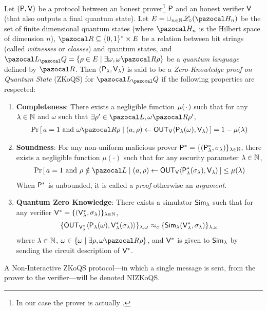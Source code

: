 \begin{definition}\label{def:NIZKoQS}
  Let $(\P,\V)$ be a protocol between an honest \QPT{} prover\footnote{In our case the prover is actually \PPT{}.} $\P{}$ and an honest \QPT{} verifier $\V{}$ (that also outputs a final quantum state). Let $E = \cup_{n \in \N} \linearOp_\circ(\cH_n)$ be the set of finite dimensional quantum states (where $\cH_n$ is the Hilbert space of dimension $n$), $\cR \subseteq \{0,1\}^* \times E $ be a relation between bit strings (called \emph{witnesses} or \emph{classes}) and quantum states, and $\lang_\cQ = \{\rho \in E \mid \exists \omega, \omega \cR \rho\}$ be a \emph{quantum language} defined by $\cR$. Then $(\P_\lambda{},\V_\lambda{})$ is said to be a \emph{Zero-Knowledge proof on Quantum State} (ZKoQS) for $\lang_\cQ$ if the following properties are respected:
  \begin{enumerate}
    \item \textbf{Completeness}: There exists a negligible function $\mu(\cdotwild)$ such that for any $\lambda \in \N$ and $\omega$ such that $\exists \rho' \in \lang, \omega \cR \rho'$,
          \begin{align}
            \pr{a = 1 \text{ and } \omega \cR \rho \mid (a,\rho) \leftarrow \OUT_\V{}\langle \P_\lambda(\omega), \V_\lambda\rangle} = 1-\mu(\lambda)
          \end{align}
    \item \textbf{Soundness}: For any non-uniform \QPT{} malicious prover $\P{}^* = \{(\P{}^*_\lambda, \sigma_\lambda)\}_{\lambda \in \N}$, there exists a negligible function $\mu(\cdot)$ such that for any security parameter $\lambda \in \N$,
          \begin{align}
            \pr{ a = 1 \text{ and } \rho \notin \lang \mid (a,\rho) \leftarrow \OUT_\V\langle \P{}^*_\lambda(\sigma_\lambda), \V_\lambda\rangle}\leq \mu(\lambda)
          \end{align}
          When $\P^*$ is unbounded, it is called a \emph{proof} otherwise an \emph{argument}.
    \item \textbf{Quantum Zero Knowledge}: There exists a \QPT{} simulator $\Sim_\lambda$ such that for any \QPT{} verifier $\V{}^* = \{(\V{}^*_\lambda,\sigma_\lambda)\}_{\lambda \in \N}$,
          \begin{align}
            \{\OUT_{\V{}^*_\lambda}\langle \P_\lambda{}(\omega), \V{}^*_\lambda(\sigma_\lambda)\rangle\}_{\lambda,\omega} \approx_c \{\Sim_\lambda(\V{}^*_\lambda,\sigma_\lambda)\}_{\lambda,\omega}
          \end{align}
          where $\lambda \in \N$, $\omega \in \{\omega \mid \exists \rho, \omega \cR \rho\}$, and $\V{}^*$ is given to $\Sim_\lambda$ by sending the circuit description of $\V{}^*$.
  \end{enumerate}
  A Non-Interactive ZKoQS protocol---in which a single message is sent, from the prover to the verifier---will be denoted NIZKoQS.
\end{definition}

